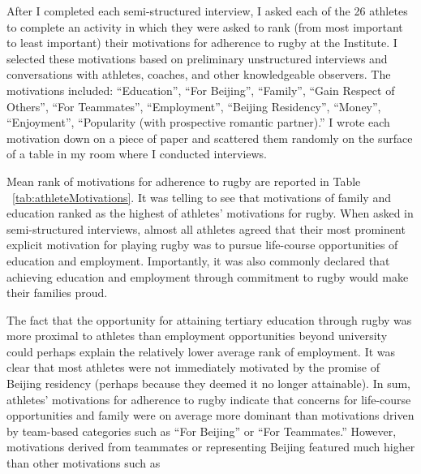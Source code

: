 \begin{CJK}{UTF8}{gbsn}
After I completed each semi-structured interview, I asked each of the 26 athletes to complete an activity in which they were asked to rank (from most important to least important) their motivations for adherence to rugby at the Institute.  I selected these motivations based on preliminary unstructured interviews and conversations with athletes, coaches, and other knowledgeable observers.  The motivations included: ``Education'', ``For Beijing'', ``Family'', ``Gain Respect of Others'', ``For Teammates'', ``Employment'', ``Beijing Residency'', ``Money'', ``Enjoyment'', ``Popularity (with prospective romantic partner).'' I wrote each motivation down on a piece of paper and scattered them randomly on the surface of a table in my room where I conducted interviews.

Mean rank of motivations for adherence to rugby are reported in Table ~\ref{tab:athleteMotivations}.  It was telling to see that motivations of family and education ranked as the highest of athletes' motivations for rugby.  When asked in semi-structured interviews, almost all athletes agreed that their most prominent explicit motivation for playing rugby was to pursue life-course opportunities of education and employment.  Importantly, it was also commonly declared that achieving education and employment through commitment to rugby would make their families proud.

The fact that the opportunity for attaining tertiary education through rugby was more proximal to athletes than employment opportunities beyond university could perhaps explain the relatively lower average rank of employment. It was clear that most athletes were not immediately motivated by the promise of Beijing residency (perhaps because they deemed it no longer attainable).  In sum, athletes' motivations for adherence to rugby indicate that concerns for life-course opportunities and family were on average more dominant than motivations driven by team-based categories such as ``For Beijing'' or ``For Teammates.''  However, motivations derived from teammates or representing Beijing featured much higher than other motivations such as

     


\end{CJK}
